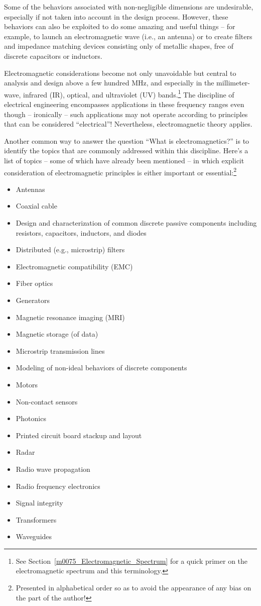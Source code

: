 Some of the behaviors associated with non-negligible dimensions are undesirable, especially if not taken into account in the design process.
However, these behaviors can also be exploited to do some amazing and useful things -- for example, to launch an electromagnetic wave (i.e., an antenna) or to create filters and impedance matching devices consisting only of metallic shapes, free of discrete capacitors or inductors.   

Electromagnetic considerations become not only unavoidable but central to analysis and design above a few hundred MHz, and especially in the millimeter-wave, infrared (IR), optical, and ultraviolet (UV) bands.\footnote{See Section~\ref{m0075_Electromagnetic_Spectrum} for a quick primer on the electromagnetic spectrum and this terminology.}
The discipline of electrical engineering encompasses applications in these frequency ranges even though -- ironically -- such applications may not operate according to principles that can be considered ``electrical''!
Nevertheless, electromagnetic theory applies.

Another common way to answer the question ``What is electromagnetics?'' is to identify the topics that are commonly addressed within this discipline.
Here's a list of topics -- some of which have already been mentioned -- in which explicit consideration of electromagnetic principles is either important or essential:\footnote{Presented in alphabetical order so as to avoid the appearance of any bias on the part of the author!}
%
\begin{itemize}
\item Antennas
\item Coaxial cable
\item Design and characterization of common discrete passive components including resistors, capacitors, inductors, and diodes
\item Distributed (e.g., microstrip) filters
\item Electromagnetic compatibility (EMC)
\item Fiber optics
\item Generators
\item Magnetic resonance imaging (MRI)
\item Magnetic storage (of data)
\item Microstrip transmission lines
\item Modeling of non-ideal behaviors of discrete components
\item Motors
\item Non-contact sensors
\item Photonics
\item Printed circuit board stackup and layout
\item Radar
\item Radio wave propagation
\item Radio frequency electronics
\item Signal integrity
\item Transformers
\item Waveguides
\end{itemize}


